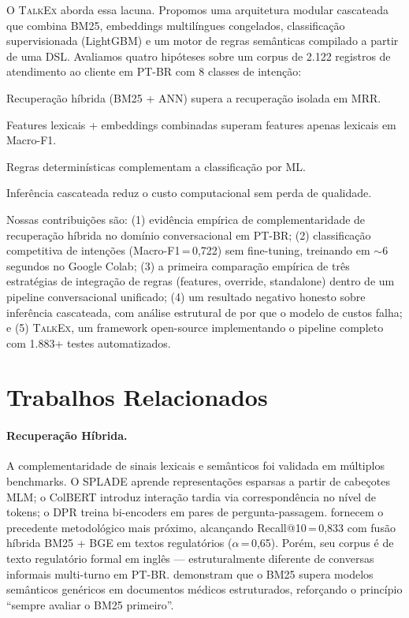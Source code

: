 \documentclass[11pt]{article}
\newcommand{\talkex}{\textsc{TalkEx}}
\newcommand{\macrof}{Macro-F1}
\begin{document}
O \talkex{} aborda essa lacuna. Propomos uma arquitetura modular cascateada que combina BM25, embeddings multilíngues congelados, classificação supervisionada (LightGBM) e um motor de regras semânticas compilado a partir de uma DSL. Avaliamos quatro hipóteses sobre um corpus de 2.122 registros de atendimento ao cliente em PT-BR com 8 classes de intenção:

\begin{description}[leftmargin=0.5cm,itemsep=2pt]
    \item[H1] Recuperação híbrida (BM25 + ANN) supera a recuperação isolada em MRR.
    \item[H2] Features lexicais + embeddings combinadas superam features apenas lexicais em \macrof{}.
    \item[H3] Regras determinísticas complementam a classificação por ML.
    \item[H4] Inferência cascateada reduz o custo computacional sem perda de qualidade.
\end{description}

Nossas contribuições são: (1) evidência empírica de complementaridade de recuperação híbrida no domínio conversacional em PT-BR; (2) classificação competitiva de intenções (\macrof{}\,=\,0,722) sem fine-tuning, treinando em $\sim$6 segundos no Google Colab; (3) a primeira comparação empírica de três estratégias de integração de regras (features, override, standalone) dentro de um pipeline conversacional unificado; (4) um resultado negativo honesto sobre inferência cascateada, com análise estrutural de por que o modelo de custos falha; e (5) \talkex{}, um framework open-source implementando o pipeline completo com 1.883+ testes automatizados.


\section{Trabalhos Relacionados}
\label{sec:related}

\paragraph{Recuperação Híbrida.} A complementaridade de sinais lexicais e semânticos foi validada em múltiplos benchmarks. O SPLADE \citep{formal2021splade} aprende representações esparsas a partir de cabeçotes MLM; o ColBERT \citep{khattab2020colbert} introduz interação tardia via correspondência no nível de tokens; o DPR \citep{karpukhin2020dense} treina bi-encoders em pares de pergunta-passagem. \citet{rayo2025hybrid} fornecem o precedente metodológico mais próximo, alcançando Recall@10\,=\,0,833 com fusão híbrida BM25 + BGE em textos regulatórios ($\alpha$\,=\,0,65). Porém, seu corpus é de texto regulatório formal em inglês --- estruturalmente diferente de conversas informais multi-turno em PT-BR. \citet{harris2024bm25} demonstram que o BM25 supera modelos semânticos genéricos em documentos médicos estruturados, reforçando o princípio ``sempre avaliar o BM25 primeiro''.
\end{document}
